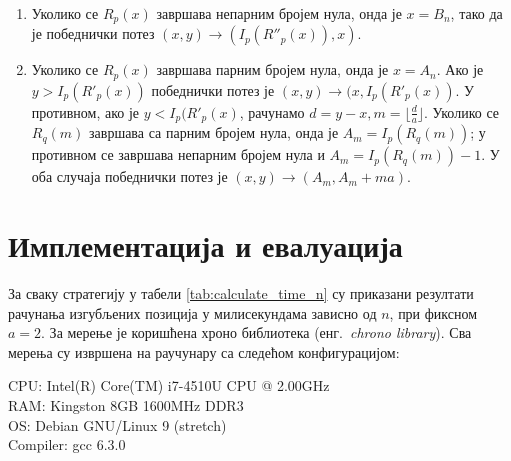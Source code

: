 \documentclass[a4paper]{article}
\begin{document}
\begin{enumerate}
	\item \label{item:neparne_nule} Уколико се $ R_{p}(x) $ завршава непарним бројем нула, онда је $ x = B_{n} $, тако да је победнички потез $ (x, y) \rightarrow (I_{p}(R''_{p}(x)), x) $.
	\item \label{item:parne_nule} Уколико се $ R_{p}(x) $ завршава парним бројем нула, онда је $ x = A_{n} $. Ако је $ y > I_{p}(R'_{p}(x)) $ победнички потез је $ (x, y) \rightarrow (x, I_{p}(R'_{p}(x)) $. У противном, ако је $ y < I_{p}(R'_{p}(x) $, рачунамо $ d = y - x, m = \lfloor \frac{d}{a} \rfloor $. Уколико се $ R_{q}(m) $ завршава са парним бројем нула, онда је $ A_{m} = I_{p}(R_{q}(m)) $; у противном се завршава непарним бројем нула и $ A_{m} = I_{p}(R_{q}(m)) - 1 $. У оба случаја победнички потез је $ (x, y) \rightarrow (A_{m}, A_{m} + ma) $.
\end{enumerate}

\section{Имплементација и евалуација}
\label{sec:implementacija_evaluacija}

За сваку стратегију у табели \ref{tab:calculate_time_n} су приказани резултати рачунања изгубљених позиција у милисекундама зависно од $ n $, при фиксном $ a = 2 $. 
За мерење је коришћена хроно библиотека (енг.{~\em chrono library}). Сва мерења су извршена на раучунару са следећом конфигурацијом:
\begin{flushleft}
	CPU: Intel(R) Core(TM) i7-4510U CPU @ 2.00GHz\\
	RAM: Kingston 8GB 1600MHz DDR3\\
	OS: Debian GNU/Linux 9 (stretch)\\
	Compiler: gcc 6.3.0\\
\end{flushleft}

\end{document}
